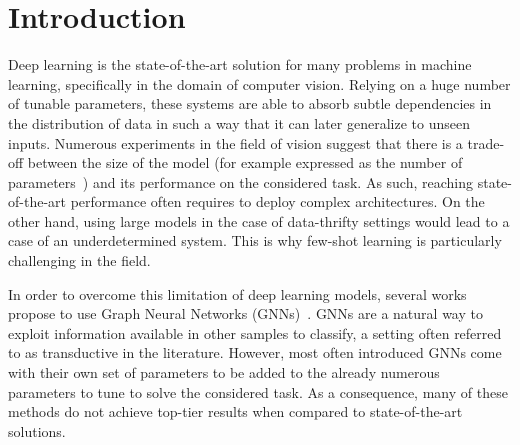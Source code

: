 \documentclass[a4paper,conference]{IEEEtran}
\begin{document}
\section{Introduction}
\label{section:introduction}

Deep learning is the state-of-the-art solution for many problems in machine learning, specifically in the domain of computer vision. Relying on a huge number of tunable parameters, these systems are able to absorb subtle dependencies in the distribution of data in such a way that it can later generalize to unseen inputs. Numerous experiments in the field of vision suggest that there is a trade-off between the size of the model (for example expressed as the number of parameters~\cite{tan2019efficientnet}) and its performance on the considered task. As such, reaching state-of-the-art performance often requires to deploy complex architectures. On the other hand, using large models in the case of data-thrifty settings would lead to a case of an underdetermined system. This is why few-shot learning is particularly challenging in the field. 

In order to overcome this limitation of deep learning models, several works propose to use Graph Neural Networks (GNNs)~\cite{garcia2017few,kim2019edge,gidaris2019generating,liu2018learning}. GNNs are a natural way to exploit information available in other samples to classify, a setting often referred to as transductive in the literature. However, most often introduced GNNs come with their own set of parameters to be added to the already numerous parameters to tune to solve the considered task.  As a consequence, many of these methods do not achieve top-tier results when compared to state-of-the-art solutions.
\end{document}
